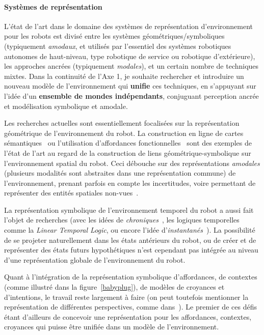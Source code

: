 \documentclass[a4paper]{article}
\begin{document}
\paragraph{Systèmes de représentation}

L'état de l'art dans le domaine des systèmes de représentation d'environnement
pour les robots est divisé entre les systèmes géométriques/symboliques
(typiquement \emph{amodaux}, et utilisés par l'essentiel des systèmes robotiques
autonomes de haut-niveau, type robotique de service ou robotique d'extérieure),
les approches ancrées (typiquement \emph{modales}), et un certain nombre de
techniques mixtes. Dans la continuité de l'Axe 1, je souhaite rechercher et
introduire un nouveau modèle de l'environnement qui \textbf{unifie} ces
techniques, en s'appuyant sur l'idée d'un \textbf{ensemble de mondes
indépendants}, conjuguant perception ancrée et modélisation symbolique et amodale.

Les recherches actuelles sont essentiellement focalisées sur la représentation
géométrique de l'environnement du robot. La construction en ligne de cartes
sémantiques~\cite{Nuechter2008, Galindo2008, Blodow2011} ou l'utilisation
d'affordances fonctionnelles~\cite{Varadarajan2011} sont des exemples de l'état
de l'art au regard de la construction de liens géométrique-symbolique sur
l'environnement spatial du robot. Ceci débouche sur des représentations
\emph{amodales} (plusieurs modalités sont abstraites dans une représentation
commune) de l'environnement, prenant parfois en compte les incertitudes, voire
permettant de représenter des entités spatiales non-vues~\cite{Mavridis2006}.

La représentation symbolique de l'environnement temporel du robot a aussi fait
l'objet de recherches (avec les idées de \emph{chroniques}~\cite{Ghallab1996},
les logiques temporelles comme la \emph{Linear Temporal Logic}, ou encore
l'idée d'\emph{instantanés}~\cite{Mavridis2006}).  La possibilité de se projeter
naturellement dans les états antérieurs du robot, ou de créer et de représenter
des états futurs hypothétiques n'est cependant pas intégrée au niveau d'une
représentation globale de l'environnement du robot.

Quant à l'intégration de la représentation symbolique d'affordances, de
contextes (comme illustré dans la figure~\ref{babyplug}), de modèles de
croyances et d'intentions, le travail reste largement à faire (on peut toutefois
mentionner la représentation de différentes perspectives, comme
dans~\cite{ros2010which}). Le premier de ces défis étant d'ailleurs de concevoir
une représentation pour les affordances, contextes, croyances qui
puisse être unifiée dans un modèle de l'environnement.
\end{document}
